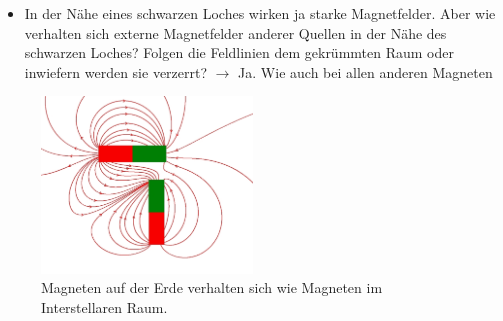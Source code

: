 \begin{frame}
  \begin{itemize}
    \setlength\itemsep{2em}
    \item In der Nähe eines schwarzen Loches wirken ja starke Magnetfelder. Aber
    wie verhalten sich externe Magnetfelder anderer Quellen in der Nähe des
    schwarzen Loches? Folgen die Feldlinien dem gekrümmten Raum oder inwiefern
    werden sie verzerrt?
    $\longrightarrow$ Ja. Wie auch bei allen anderen Magneten
  \end{itemize}
\begin{figure}[H]
  \centering
  \includegraphics[width=0.5\textwidth]{images/Frage3.png}
  \caption{Magneten auf der Erde verhalten sich wie Magneten im Interstellaren Raum.}
\end{figure}
\end{frame}
